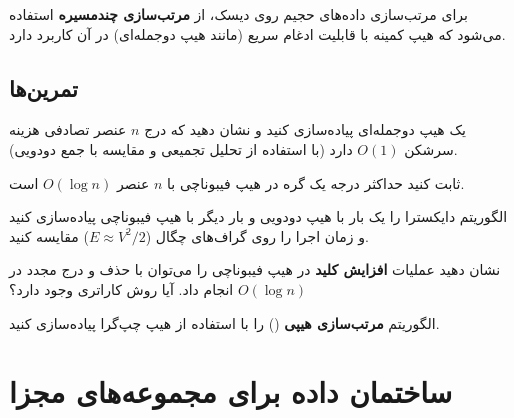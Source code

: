 \documentclass{matinbook}
\begin{document}
    برای مرتب‌سازی داده‌های حجیم روی دیسک،
    از \textbf{مرتب‌سازی چندمسیره} استفاده می‌شود
    که هیپ کمینه با قابلیت ادغام سریع
    (مانند هیپ دوجمله‌ای) در آن کاربرد دارد.
    
    \section{تمرین‌ها}
    
    \begin{exercise}
        یک هیپ دوجمله‌ای پیاده‌سازی کنید
        و نشان دهید که درج $n$ عنصر تصادفی
        هزینه سرشکن $O(1)$ دارد
        (با استفاده از تحلیل تجمیعی
        و مقایسه با جمع دودویی).
        \label{exc:binomial-insert-amortized}
    \end{exercise}
    
    \begin{exercise}
        ثابت کنید حداکثر درجه یک گره
        در هیپ فیبوناچی با $n$ عنصر
        $O(\log n)$ است.
        \label{exc:fibonacci-degree}
    \end{exercise}
    
    \begin{exercise}
        الگوریتم دایکسترا را یک بار با هیپ دودویی
        و بار دیگر با هیپ فیبوناچی پیاده‌سازی کنید
        و زمان اجرا را روی گراف‌های چگال
        ($E \approx V^{2}/2$) مقایسه کنید.
        \label{exc:dijkstra-heap-comparison}
    \end{exercise}
    
    \begin{exercise}
        نشان دهید عملیات \textbf{افزایش کلید}
        در هیپ فیبوناچی را می‌توان با
        حذف و درج مجدد در $O(\log n)$
        انجام داد. آیا روش کاراتری وجود دارد؟
        \label{exc:increase-key}
    \end{exercise}
    
    \begin{exercise}
        الگوریتم \textbf{مرتب‌سازی هیپی}
        () را با استفاده از
        هیپ چپ‌گرا پیاده‌سازی کنید.
        \label{exc:heapsort-leftist}
    \end{exercise}
    
    
    
    \chapter{ساختمان داده برای مجموعه‌های مجزا}
    \label{chap:union-find}
    
\end{document}
